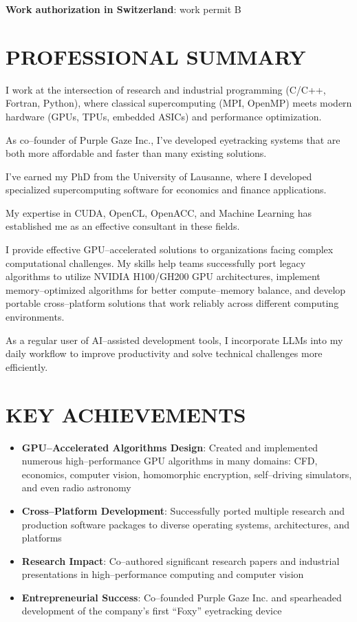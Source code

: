 \documentclass[a4paper]{moderncv}
\begin{document}
\maketitle

\textbf{Work authorization in Switzerland}: work permit B

\section{PROFESSIONAL SUMMARY}

I work at the intersection of research and industrial programming (C/C++, Fortran, Python), where classical supercomputing (MPI, OpenMP) meets modern hardware (GPUs, TPUs, embedded ASICs) and performance optimization.

As co--founder of Purple Gaze Inc., I've developed eyetracking systems that are both more affordable and faster than many existing solutions.

I've earned my PhD from the University of Lausanne, where I developed specialized supercomputing software for economics and finance applications.

My expertise in CUDA, OpenCL, OpenACC, and Machine Learning has established me as an effective consultant in these fields.

I provide effective GPU--accelerated solutions to organizations facing complex computational challenges. My skills help teams successfully port legacy algorithms to utilize NVIDIA H100/GH200 GPU architectures, implement memory--optimized algorithms for better compute--memory balance, and develop portable cross--platform solutions that work reliably across different computing environments.

As a regular user of AI--assisted development tools, I incorporate LLMs into my daily workflow to improve productivity and solve technical challenges more efficiently.


\section{KEY ACHIEVEMENTS}

\begin{itemize}
\item \textbf{GPU--Accelerated Algorithms Design}: Created and implemented numerous high--performance GPU algorithms in many domains: CFD, economics, computer vision, homomorphic encryption, self--driving simulators, and even radio astronomy
\item \textbf{Cross--Platform Development}: Successfully ported multiple research and production software packages to diverse operating systems, architectures, and platforms
\item \textbf{Research Impact}: Co--authored significant research papers and industrial presentations in high--performance computing and computer vision
\item \textbf{Entrepreneurial Success}: Co--founded Purple Gaze Inc. and spearheaded development of the company's first ``Foxy'' eyetracking device
\end{itemize}
\end{document}
